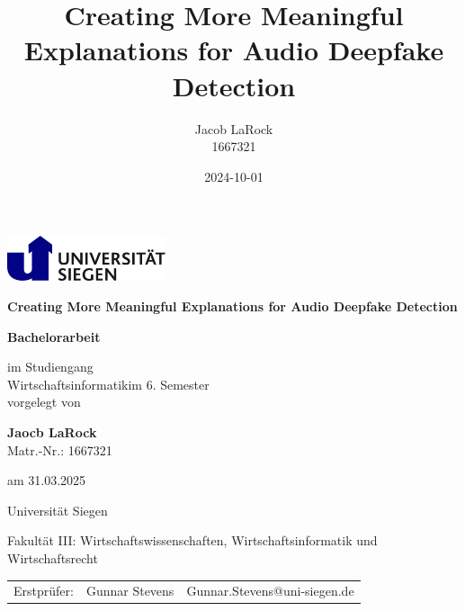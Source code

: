 \documentclass{article}
\title{Creating More Meaningful Explanations for Audio Deepfake Detection}
\date{2024-10-01}
\author{Jacob LaRock\\1667321}
\makeatletter
\def\Institute{Universität Siegen}
\def\KindOfWork{Bachelorarbeit}
\def\Studiengang{Wirtschaftsinformatik}
\def\Fakultaet{Fakultät III: Wirtschaftswissenschaften, Wirtschaftsinformatik und Wirtschaftsrecht}
\def\Title{Creating More Meaningful Explanations for Audio Deepfake Detection}
\def\Subtitle{}
\def\student{Jaocb LaRock}
\def\studentno{1667321}
\def\Date{31.03.2025}
\def\semester{6}
\def\erstpruefer{Gunnar Stevens}
\def\erstprueferMail{Gunnar.Stevens@uni-siegen.de}
\makeatother
\begin{document}
	\begin{titlepage}
        \begin{minipage}{0.9\linewidth}
			\centering
			\includegraphics [width=0.35\textwidth]{images/LogoSiegen}
        \end{minipage}

		\vspace{2cm}

		\centering

		{\Large\bfseries \Title\par}
		{\large\bfseries \Subtitle\par}
		\vspace{2cm}

		{\large \textbf{\KindOfWork}\par}

		\vspace{1.5cm}

		{\normalsize im Studiengang \\
			\Studiengang  im \semester. Semester \\
		}
		\vspace{0.5cm}
		{\normalsize vorgelegt von}
		\vspace{0.5cm}

		{\normalsize \textbf{\student} \\
			Matr.-Nr.: \studentno  \\}
		{am \normalsize \Date\par}

		\vspace{0.5cm}

		{\Institute} \par
		{\Fakultaet}\par

		\vspace{1cm}

    {\begin{table}[h]
			\centering
			\begin{tabular}{lll}
				{Erstprüfer:} & \erstpruefer & \erstprueferMail \\
			\end{tabular}
		\end{table}}     
		\vfill
	\end{titlepage}
    \newpage
\end{document}
